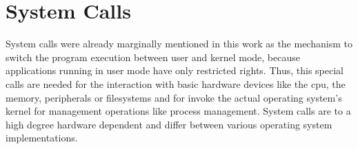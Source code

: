 \section{System Calls}\label{sec:system-calls}
System calls were already marginally mentioned in this work as the mechanism to switch the program execution between user and kernel mode, because  applications running in user mode have only restricted rights.
Thus, this special calls are needed for the interaction with basic hardware devices like the \ac{cpu}, the memory, peripherals or filesystems and for invoke the actual operating system's kernel for management operations like process management\cite{lfd430}. 
System calls are to a high degree hardware dependent and differ between various operating system implementations.
%

